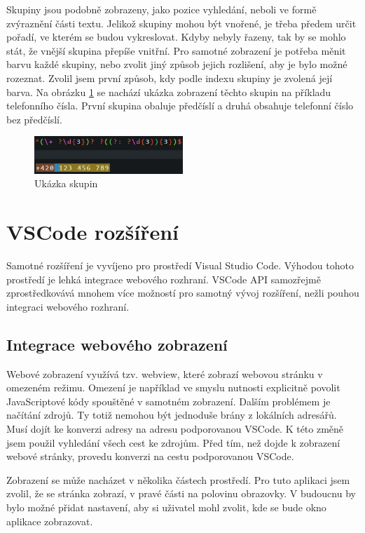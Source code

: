 Skupiny jsou podobně zobrazeny, jako pozice vyhledání, neboli ve formě zvýraznění části textu.
Jelikož skupiny mohou být vnořené, je třeba předem určit pořadí, ve kterém se budou vykreslovat.
Kdyby nebyly řazeny, tak by se mohlo stát, že vnější skupina přepíše vnitřní.
Pro samotné zobrazení je potřeba měnit barvu každé skupiny, nebo zvolit jiný způsob jejich rozlišení, aby je bylo možné rozeznat.
Zvolil jsem první způsob, kdy podle indexu skupiny je zvolená její barva.
Na obrázku \ref{fig:groupShowcase} se nachází ukázka zobrazení těchto skupin na příkladu telefonního čísla.
První skupina obaluje předčíslí a druhá obsahuje telefonní číslo bez předčíslí.

\begin{figure}[!h]
	\centering
	\includegraphics[width=0.5\textwidth]{Figures/groupShowcase.png}
	\caption{Ukázka skupin}
	\label{fig:groupShowcase}
\end{figure} 

\section{VSCode rozšíření}

Samotné rozšíření je vyvíjeno pro prostředí Visual Studio Code.
Výhodou tohoto prostředí je lehká integrace webového rozhraní.
VSCode API samozřejmě zprostředkovává mnohem více možností pro samotný vývoj rozšíření, nežli pouhou integraci webového rozhraní.

\subsection*{Integrace webového zobrazení}

Webové zobrazení využívá tzv. webview, které zobrazí webovou stránku v omezeném režimu.
Omezení je například ve smyslu nutnosti explicitně povolit JavaScriptové kódy spouštěné v samotném zobrazení.
Dalším problémem je načítání zdrojů.
Ty totiž nemohou být jednoduše brány z lokálních adresářů. 
Musí dojít ke konverzi adresy na adresu podporovanou VSCode. 
K této změně jsem použil vyhledání všech cest ke zdrojům.
Před tím, než dojde k zobrazení webové stránky, provedu konverzi na cestu podporovanou VSCode.

Zobrazení se může nacházet v několika částech prostředí.
Pro tuto aplikaci jsem zvolil, že se stránka zobrazí, v pravé části na polovinu obrazovky.
V budoucnu by bylo možné přidat nastavení, aby si uživatel mohl zvolit, kde se bude okno aplikace zobrazovat.

